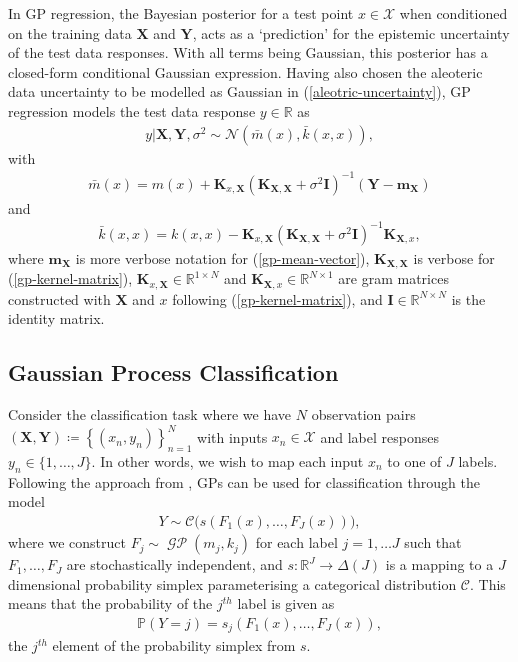 \documentclass{article}
\newcommand{\GP}{\operatorname{\mathcal{GP}}}
\numberwithin{equation}{section}
\begin{document}
In GP regression, the Bayesian posterior for a test point $x \in \mathcal{X}$ when conditioned on the training data $\mathbf{X}$ and $\mathbf{Y}$, acts as a `prediction' for the epistemic uncertainty of the test data responses. 
With all terms being Gaussian, this posterior has a closed-form conditional Gaussian expression.
Having also chosen the aleoteric data uncertainty to be modelled as Gaussian in (\ref{aleotric-uncertainty}), GP regression models the test data response $y \in \mathbb{R}$ as
\begin{align}
    y \vert \mathbf{X}, \mathbf{Y}, \sigma^2
    \sim \mathcal{N}\left(\bar{m}(x), \bar{k}(x, x)\right),
    \label{gp-posterior-normal}
\end{align}
with
\begin{align}
    \label{gp-posterior-mean}
    \bar{m}(x) = m(x) + \mathbf{K}_{x, \mathbf{X}} \left(\mathbf{K}_{\mathbf{X}, \mathbf{X}} + \sigma^2 \mathbf{I}\right)^{-1} \left( \mathbf{Y} - \mathbf{m}_{\mathbf{X}}\right)
\end{align}
and
\begin{align}
    \label{gp-posterior-covariance}
    \bar{k}(x, x) = k(x, x) - \mathbf{K}_{x, \mathbf{X}} \left(\mathbf{K}_{\mathbf{X}, \mathbf{X}} + \sigma^2 \mathbf{I}\right)^{-1} \mathbf{K}_{\mathbf{X}, x},
\end{align}
where $\mathbf{m}_{\mathbf{X}}$ is more verbose notation for (\ref{gp-mean-vector}), $\mathbf{K}_{\mathbf{X}, \mathbf{X}}$ is verbose for (\ref{gp-kernel-matrix}), $\mathbf{K}_{x, \mathbf{X}} \in \mathbb{R}^{1 \times N}$ and $\mathbf{K}_{\mathbf{X}, x} \in \mathbb{R}^{N \times 1}$ are gram matrices constructed with $\mathbf{X}$ and $x$ following (\ref{gp-kernel-matrix}), and $\mathbf{I} \in \mathbb{R}^{N \times N}$ is the identity matrix.

\subsection{Gaussian Process Classification}
Consider the classification task where we have $N$ observation pairs $(\mathbf{X}, \mathbf{Y}) \coloneqq \left\{(x_n, y_n)\right\}_{n=1}^{N}$ with inputs $x_n \in \mathcal{X}$ and label responses $y_n \in \{1, \dots, J\}$. In other words, we wish to map each input $x_n$ to one of $J$ labels. Following the approach from \cite{matthews2017scalable}, GPs can be used for classification through the model
\begin{align}
    Y \sim \mathcal{C}\Big(s\left(F_1(x), \dots, F_J(x)\right)\Big),
    \label{gp-classifier}
\end{align}
where we construct $F_j \sim \GP\left(m_j, k_j\right)$ for each label $j=1, \dots J$ such that $F_1, \dots, F_J$ are stochastically independent, and $s: \mathbb{R}^J \rightarrow \Delta(J)$ is a mapping to a $J$ dimensional probability simplex parameterising a categorical distribution $\mathcal{C}$. 
This means that the probability of the $j^{th}$ label is given as
\begin{align}
    \mathbb{P}(Y=j) = s_j(F_1(x), \dots, F_J(x)),
\end{align}
the $j^{th}$ element of the probability simplex from $s$.
\end{document}
